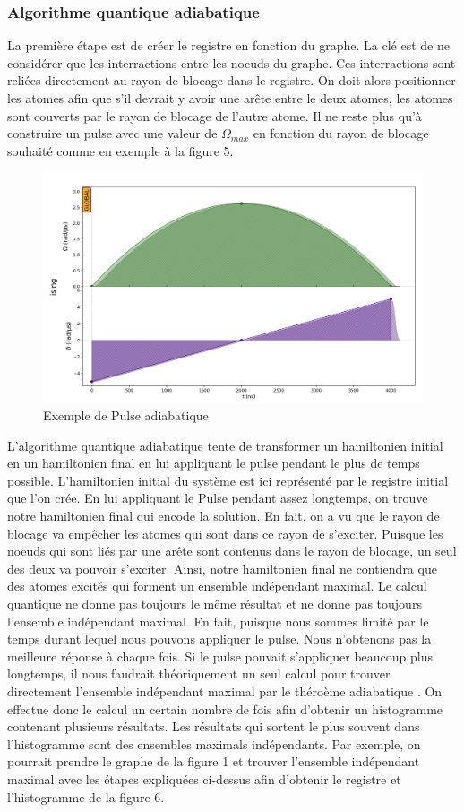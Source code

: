 \documentclass[11pt]{article}
\begin{document}
\subsubsection{Algorithme quantique adiabatique}
La première étape est de créer le registre en fonction du graphe. La clé est de ne considérer que les interractions entre les noeuds du graphe. Ces interractions sont reliées directement au rayon de blocage dans le registre. On doit alors positionner les atomes afin que s'il devrait y avoir une arête entre le deux atomes, les atomes sont couverts par le rayon de blocage de l'autre atome. Il ne reste plus qu'à construire un pulse avec une valeur de $\Omega_{max}$ en fonction du rayon de blocage souhaité comme en exemple à la figure 5.
\begin{figure}[H]
    \centering
    \includegraphics[width = 0.6\linewidth]{images/pulse_exemple.png}
    \caption{Exemple de Pulse adiabatique}
    \label{pulse_exemple}
\end{figure}
L'algorithme quantique adiabatique tente de transformer un hamiltonien initial en un hamiltonien final en lui appliquant le pulse pendant le plus de temps possible. L'hamiltonien initial du système est ici représenté par le registre initial que l'on crée. En lui appliquant le Pulse pendant assez longtemps, on trouve notre hamiltonien final qui encode la solution. En fait, on a vu que le rayon de blocage va empêcher les atomes qui sont dans ce rayon de s'exciter. Puisque les noeuds qui sont liés par une arête sont contenus dans le rayon de blocage, un seul des deux va pouvoir s'exciter. Ainsi, notre hamiltonien final ne contiendra que des atomes excités qui forment un ensemble indépendant maximal. Le calcul quantique ne donne pas toujours le même résultat et ne donne pas toujours l'ensemble indépendant maximal. En fait, puisque nous sommes limité par le temps durant lequel nous pouvons appliquer le pulse. Nous n'obtenons pas la meilleure réponse à chaque fois. Si le pulse pouvait s'appliquer beaucoup plus longtemps, il nous faudrait théoriquement un seul calcul pour trouver directement l'ensemble indépendant maximal par le théroème adiabatique \cite{amin_consistency_2009}. On effectue donc le calcul un certain nombre de fois afin d'obtenir un histogramme contenant plusieurs résultats. Les résultats qui sortent le plus souvent dans l'histogramme sont des ensembles maximals indépendants. Par exemple, on pourrait prendre le graphe de la figure 1 et trouver l'ensemble indépendant maximal avec les étapes expliquées ci-dessus afin d'obtenir le registre et l'histogramme de la figure 6.
\end{document}
